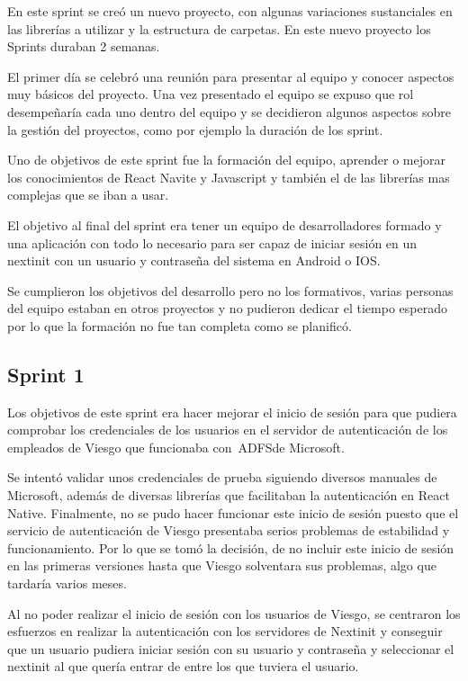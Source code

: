 En este sprint se creó un nuevo proyecto, con algunas variaciones sustanciales en las librerías a 
utilizar y la estructura de carpetas. En este nuevo proyecto los Sprints duraban 2 semanas. 

El primer 
día se celebró una reunión para presentar al equipo y conocer aspectos muy básicos del proyecto. Una 
vez presentado el equipo se expuso que rol desempeñaría cada uno dentro del equipo y se decidieron 
algunos aspectos sobre la gestión del proyectos, como por ejemplo la duración de los sprint.

Uno de objetivos de este sprint fue la formación del equipo, aprender o mejorar los conocimientos de 
React Navite y Javascript y también el de las librerías mas complejas que se iban a usar.

El objetivo al final del sprint era tener un equipo de desarrolladores formado y una aplicación 
con todo lo necesario para ser 
capaz de iniciar sesión en un nextinit con un usuario y contraseña del sistema en Android o IOS.

Se cumplieron los objetivos del desarrollo pero no los formativos, varias personas del equipo estaban 
en otros proyectos y no pudieron dedicar el tiempo esperado por lo que la formación no fue tan completa 
como se planificó.

\subsection{Sprint 1}

Los objetivos de este sprint era hacer mejorar el inicio de sesión para que pudiera comprobar los credenciales de los
usuarios en el servidor de autenticación de los empleados de Viesgo que funcionaba con~\acf{ADFS}de Microsoft.

Se intentó validar unos credenciales de prueba siguiendo diversos manuales de Microsoft, además de 
diversas librerías que facilitaban la autenticación en React Native. Finalmente, no se pudo hacer funcionar
 este inicio de sesión puesto que el servicio de autenticación de Viesgo presentaba serios problemas de
 estabilidad y funcionamiento. Por lo que se tomó la decisión, de no incluir este inicio de sesión en las 
 primeras versiones hasta que Viesgo solventara sus problemas, algo que tardaría varios meses.

Al no poder realizar el inicio de sesión con los usuarios de Viesgo, se centraron los esfuerzos en realizar
la autenticación con los servidores de Nextinit y conseguir que un usuario pudiera iniciar sesión con su 
usuario y contraseña y seleccionar el nextinit al que quería entrar de entre los que tuviera el usuario. 

